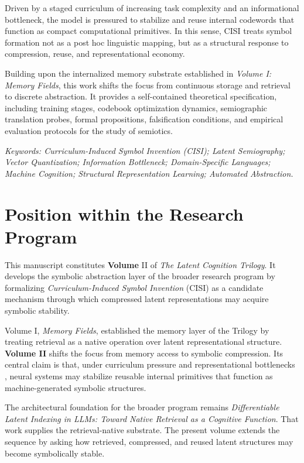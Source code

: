 Driven by a staged curriculum of increasing task complexity and an informational bottleneck, the model is pressured to stabilize and reuse internal codewords that function as compact computational primitives. In this sense, CISI treats symbol formation not as a post hoc linguistic mapping, but as a structural response to compression, reuse, and representational economy.

Building upon the internalized memory substrate established in \textit{Volume I: Memory Fields}, this work shifts the focus from continuous storage and retrieval to discrete abstraction. It provides a self-contained theoretical specification, including training stages, codebook optimization dynamics, semiographic translation probes, formal propositions, falsification conditions, and empirical evaluation protocols for the study of semiotics.

\noindent \textit{Keywords: Curriculum-Induced Symbol Invention (CISI); Latent Semiography; Vector Quantization; Information Bottleneck; Domain-Specific Languages; Machine Cognition; Structural Representation Learning; Automated Abstraction.}

\section*{Position within the Research Program}

This manuscript constitutes \textbf{Volume} II of \textit{The Latent Cognition Trilogy}. It develops the symbolic abstraction layer of the broader research program by formalizing \textit{Curriculum-Induced Symbol Invention} (CISI) as a candidate mechanism through which compressed latent representations may acquire symbolic stability.

Volume I, \textit{Memory Fields}, established the memory layer of the Trilogy by treating retrieval as a native operation over latent representational structure. \textbf{Volume II} shifts the focus from memory access to symbolic compression. Its central claim is that, under curriculum pressure and representational bottlenecks \cite{Tishby2015}, neural systems may stabilize reusable internal primitives that function as machine-generated symbolic structures.

The architectural foundation for the broader program remains \textit{Differentiable Latent Indexing in LLMs: Toward Native Retrieval as a Cognitive Function}. That work supplies the retrieval-native substrate. The present volume extends the sequence by asking how retrieved, compressed, and reused latent structures may become symbolically stable.


